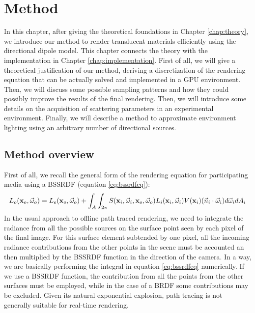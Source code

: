 \chapter{Method}
\label{chap:method}
In this chapter, after giving the theoretical foundations in Chapter \ref{chap:theory}, we introduce our method to render translucent materials efficiently using the directional dipole model. This chapter connects the theory with the implementation in Chapter \ref{chap:implementation}. First of all, we will give a theoretical justification of our method, deriving a discretization of the rendering equation that can be actually solved and implemented in a GPU environment. Then, we will discuss some possible sampling patterns and how they could possibly improve the results of the final rendering. Then, we will introduce some details on the acquisition of scattering parameters in an experimental environment. Finally, we will describe a method to approximate environment lighting using an arbitrary number of directional sources.

\section{Method overview}
\label{sec:m_overv}
First of all, we recall the general form of the rendering equation for participating media using a BSSRDF (equation \ref{eq:bssrdfeq}):
\begin{equation*}
L_o(\mathbf{x}_o,\vec{\omega}_o) = L_e(\mathbf{x}_o,\vec{\omega}_o) + \int_A \int_{2\pi} S(\mathbf{x}_i, \vec{\omega}_i, \mathbf{x}_o, \vec{\omega}_o) L_i(\mathbf{x}_i,\vec{\omega}_i) V(\mathbf{x}_i) (\vec{n}_i \cdot \vec{\omega}_i) d\vec{\omega}_i d A_i
\end{equation*}
In the usual approach to offline path traced rendering, we need to integrate the radiance from all the possible sources on the surface point seen by each pixel of the final image. For this surface element subtended by one pixel, all the incoming radiance contributions from the other points in the scene must be accounted an then multiplied by the BSSRDF function in the direction of the camera. In a way, we are basically performing the integral in equation \ref{eq:bssrdfeq} numerically. If we use a BSSRDF function, the contribution from all the points from the other surfaces must be employed, while in the case of a BRDF some contributions may be excluded. Given its natural exponential explosion, path tracing is not generally suitable for real-time rendering.

